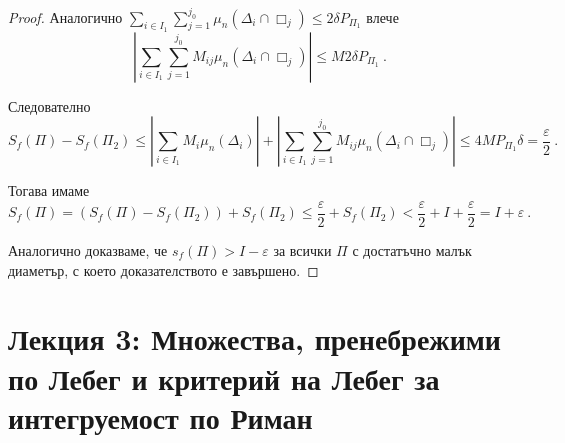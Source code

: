 \documentclass[11pt]{article}
\numberwithin{equation}{section}
\numberwithin{figure}{section}
\numberwithin{table}{section}
\theoremstyle{plain}
\theoremstyle{definition}
\theoremstyle{remark}
\theoremstyle{definition}
\theoremstyle{remark}
\theoremstyle{plain}
\theoremstyle{definition}
\theoremstyle{definition}
\theoremstyle{plain}
\theoremstyle{plain}
\theoremstyle{plain}
\theoremstyle{definition}
\theoremstyle{plain}
\begin{document}
\begin{proof}
Аналогично
$\sum_{i\in I_1} \sum_{j=1}^{j_0} \mu_n (\Delta_i\cap \Box_j)\leq 2 \delta P_{\Pi_1}$ влече $$\left|\sum_{i\in I_1} \sum_{j=1}^{j_0} M_{ij} \mu_n (\Delta_i\cap \Box_j)\right| \leq M 2 \delta  P_{\Pi_1} \ .$$

Следователно
$$
S_f(\Pi) - S_f(\Pi_2) \leq \left|\sum_{i\in I_1} M_i \mu_n (\Delta_i)\right| + \left|\sum_{i\in I_1} \sum_{j=1}^{j_0} M_{ij} \mu_n (\Delta_i\cap \Box_j)\right| \leq 4M P_{\Pi_1} \delta =  \frac{\varepsilon}{2} \ .
$$

Тогава имаме
$$
S_f(\Pi) = (S_f(\Pi) - S_f(\Pi_2)) + S_f(\Pi_2) \leq \frac{\varepsilon}{2} + S_f(\Pi_2) < \frac{\varepsilon}{2} + I + \frac{\varepsilon}{2} = I+\varepsilon \ .
$$

Аналогично доказваме, че $s_f(\Pi) > I-\varepsilon$ за всички $\Pi$ с достатъчно малък диаметър, с което доказателството е завършено.
\end{proof}

\newpage

\section{Лекция 3: Множества, пренебрежими по Лебег и критерий на Лебег за интегруемост по Риман}
\end{document}
